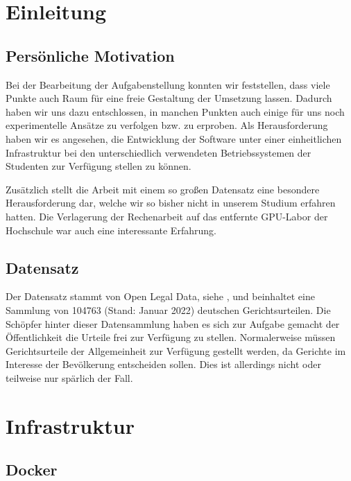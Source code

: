 \chapter{Einleitung}

\section{Persönliche Motivation}

Bei der Bearbeitung der Aufgabenstellung konnten wir feststellen, dass viele Punkte auch Raum für eine freie Gestaltung der Umsetzung lassen. Dadurch haben wir uns dazu entschlossen, in manchen Punkten auch einige für uns noch experimentelle Ansätze zu verfolgen bzw. zu erproben. Als Herausforderung haben wir es angesehen, die Entwicklung der Software unter einer einheitlichen Infrastruktur bei den unterschiedlich verwendeten Betriebssystemen der Studenten zur Verfügung stellen zu können. 

Zusätzlich stellt die Arbeit mit einem so großen Datensatz eine besondere Herausforderung dar, welche wir so bisher nicht in unserem Studium erfahren hatten. Die Verlagerung der Rechenarbeit auf das entfernte GPU-Labor der Hochschule war auch eine interessante Erfahrung.

\section{Datensatz}
Der Datensatz stammt von Open Legal Data, siehe \cite{openlegaldata}, und beinhaltet eine Sammlung von 104763 (Stand: Januar 2022) deutschen Gerichtsurteilen. Die Schöpfer hinter dieser Datensammlung haben es sich zur Aufgabe gemacht der Öffentlichkeit die Urteile frei zur Verfügung zu stellen. Normalerweise müssen Gerichtsurteile der Allgemeinheit zur Verfügung gestellt werden, da Gerichte im Interesse der Bevölkerung entscheiden sollen. Dies ist allerdings nicht oder teilweise nur spärlich der Fall.

\chapter{Infrastruktur}

\section{Docker}

